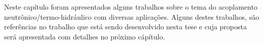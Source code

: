 \documentclass[12pt,openright,twoside,a4paper,english,french,spanish,brazil]{abntex2}
\begin{document}
Neste capítulo foram apresentados alguns trabalhos sobre o tema do acoplamento neutrônico/termo-hidráulico 
com diversas aplicações. Alguns destes trabalhos, são referências no trabalho que está sendo desenvolvido 
nesta tese e cuja proposta será apresentada com detalhes no próximo cápítulo.

\end{document}

